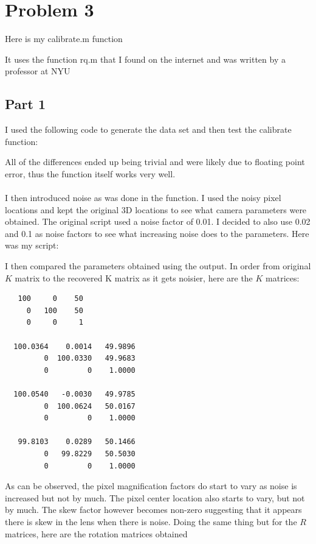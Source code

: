 \documentclass[11pt,psfig]{article}
\begin{document}
\newpage


\section{Problem 3}

Here is my calibrate.m function

It uses the function rq.m that I found on the internet and was written by a professor at NYU


\subsection{Part 1}

I used the following code to generate the data set and then test the calibrate function:

All of the differences ended up being trivial and were likely due to floating point error, thus the function itself works very well. \\
\\
I then introduced noise as was done in the function. I used the noisy pixel locations and kept the original 3D locations to see what camera parameters were obtained. The original script used a noise factor of 0.01. I decided to also use 0.02 and 0.1 as noise factors to see what increasing noise does to the parameters. Here was my script:


I then compared the parameters obtained using the output. In order from original $K$ matrix to the recovered K matrix as it gets noisier, here are the $K$ matrices:
\begin{verbatim}
   100     0    50
     0   100    50
     0     0     1

  100.0364    0.0014   49.9896
         0  100.0330   49.9683
         0         0    1.0000

  100.0540   -0.0030   49.9785
         0  100.0624   50.0167
         0         0    1.0000

   99.8103    0.0289   50.1466
         0   99.8229   50.5030
         0         0    1.0000
\end{verbatim}

As can be observed, the pixel magnification factors do start to vary as noise is increased but not by much. The pixel center location also starts to vary, but not by much. The skew factor however becomes non-zero suggesting that it appears there is skew in the lens when there is noise. 
\newpage
Doing the same thing but for the $R$ matrices, here are the rotation matrices obtained
\end{document}
